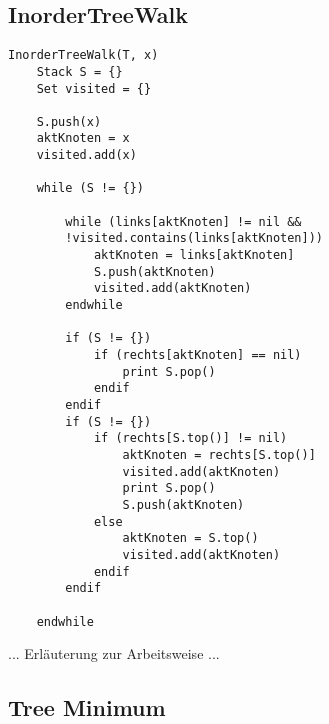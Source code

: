 \subsection*{InorderTreeWalk}

\begin{lstlisting}
InorderTreeWalk(T, x)
	Stack S = {}
	Set visited = {}
	
	S.push(x)
	aktKnoten = x
	visited.add(x)
	
	while (S != {})
	
		while (links[aktKnoten] != nil &&
		!visited.contains(links[aktKnoten]))
			aktKnoten = links[aktKnoten]
			S.push(aktKnoten)
			visited.add(aktKnoten)
		endwhile

		if (S != {})
			if (rechts[aktKnoten] == nil)
				print S.pop()
			endif
		endif
		if (S != {})
			if (rechts[S.top()] != nil)
				aktKnoten = rechts[S.top()]
				visited.add(aktKnoten)
				print S.pop()
				S.push(aktKnoten)
			else
				aktKnoten = S.top()
				visited.add(aktKnoten)
			endif
		endif
		
	endwhile
\end{lstlisting}

... Erläuterung zur Arbeitsweise ...

\subsection*{Tree Minimum}